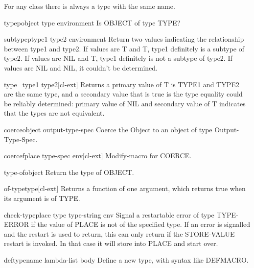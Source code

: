 \documentclass[10pt,english]{book}
\begin{document}
For any class there is always a type with the same name.

\begin{function}{typep}{object type \op environment}
  Is OBJECT of type TYPE?
\end{function}

\begin{function}{subtypep}{type1 type2 \op environment}
  Return two values indicating the relationship between type1 and type2.
  If values are T and T, type1 definitely is a subtype of type2.
  If values are NIL and T, type1 definitely is not a subtype of type2.
  If values are NIL and NIL, it couldn't be determined.
\end{function}

\begin{function}{type=}{type1 type2}[cl-ext]
  Returns a primary value of T is TYPE1 and TYPE2 are the same type,
and a secondary value that is true is the type equality could be reliably
determined: primary value of NIL and secondary value of T indicates that the
types are not equivalent.
\end{function}

\begin{function}{coerce}{object output-type-spec}
  Coerce the Object to an object of type Output-Type-Spec.
\end{function}

\begin{macro}{coercef}{place type-spec \env env}[cl-ext]
  Modify-macro for COERCE.
\end{macro}

\begin{function}{type-of}{object}
  Return the type of OBJECT.
\end{function}

\begin{function}{of-type}{type}[cl-ext]
  Returns a function of one argument, which returns true when its argument is
of TYPE.
\end{function}

\begin{macro}{check-type}{place type \op type-string \env env}
  Signal a restartable error of type TYPE-ERROR if the value of PLACE
is not of the specified type. If an error is signalled and the restart
is used to return, this can only return if the STORE-VALUE restart is
invoked. In that case it will store into PLACE and start over.
\end{macro}

\begin{macro}{deftype}{name lambda-list \body body}
  Define a new type, with syntax like DEFMACRO.
\end{macro}
\end{document}
